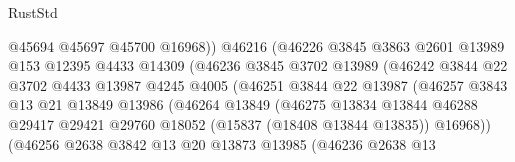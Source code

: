 \begin{lexlean}{RustStd}
\begin{coremodule}
                                  @45694
                                  @45697
                                  @45700
                                  @16968))
                              @46216
                              (@46226
                                @3845
                                @3863
                                @2601
                                @13989
                                @153
                                @12395
                                @4433
                                @14309
                                (@46236
                                  @3845
                                  @3702
                                  @13989
                                  (@46242
                                    @3844
                                    @22
                                    @3702
                                    @4433
                                    @13987
                                    @4245
                                    @4005
                                    (@46251
                                      @3844
                                      @22
                                      @13987
                                      (@46257
                                        @3843
                                        @13
                                        @21
                                        @13849
                                        @13986
                                        (@46264
                                          @13849
                                          (@46275
                                            @13834
                                            @13844
                                            @46288
                                            @29417
                                            @29421
                                            @29760
                                            @18052
                                            (@15837 (@18408 @13844 @13835))
                                            @16968))
                                        (@46256
                                          @2638
                                          @3842
                                          @13
                                          @20
                                          @13873
                                          @13985
                                          (@46236
                                            @2638
                                            @13

\end{coremodule}
\end{lexlean}
